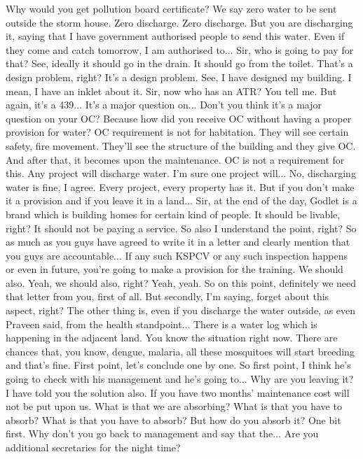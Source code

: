 Why would you get pollution board certificate?
We say zero water to be sent outside the storm house.
Zero discharge.
Zero discharge.
But you are discharging it, saying that I have government authorised people to send this water.
Even if they come and catch tomorrow, I am authorised to...
Sir, who is going to pay for that?
See, ideally it should go in the drain.
It should go from the toilet.
That's a design problem, right?
It's a design problem.
See, I have designed my building.
I mean, I have an inklet about it.
Sir, now who has an ATR?
You tell me.
But again, it's a 439...
It's a major question on...
Don't you think it's a major question on your OC?
Because how did you receive OC without having a proper provision for water?
OC requirement is not for habitation.
They will see certain safety, fire movement.
They'll see the structure of the building and they give OC.
And after that, it becomes upon the maintenance.
OC is not a requirement for this.
Any project will discharge water.
I'm sure one project will...
No, discharging water is fine, I agree.
Every project, every property has it.
But if you don't make it a provision and if you leave it in a land...
Sir, at the end of the day, Godlet is a brand which is building homes for certain kind of people.
It should be livable, right?
It should not be paying a service.
So also I understand the point, right?
So as much as you guys have agreed to write it in a letter and clearly mention that you guys are accountable...
If any such KSPCV or any such inspection happens or even in future, you're going to make a provision for the training.
We should also.
Yeah, we should also, right?
Yeah, yeah.
So on this point, definitely we need that letter from you, first of all.
But secondly, I'm saying, forget about this aspect, right?
The other thing is, even if you discharge the water outside, as even Praveen said, from the health standpoint...
There is a water log which is happening in the adjacent land.
You know the situation right now.
There are chances that, you know, dengue, malaria, all these mosquitoes will start breeding and that's fine.
First point, let's conclude one by one.
So first point, I think he's going to check with his management and he's going to...
Why are you leaving it?
I have told you the solution also.
If you have two months' maintenance cost will not be put upon us.
What is that we are absorbing?
What is that you have to absorb?
What is that you have to absorb?
But how do you absorb it?
One bit first.
Why don't you go back to management and say that the...
Are you additional secretaries for the night time?
